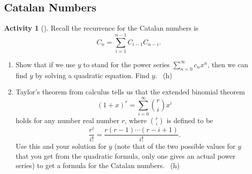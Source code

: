 \documentclass[10pt,]{book}
\theoremstyle{plain}
\theoremstyle{definition}
\theoremstyle{definition}
\theoremstyle{definition}
\newtheorem{activity}[project]{Activity}
\numberwithin{equation}{chapter}
\begin{document}
\subsection[{Catalan Numbers}]{Catalan Numbers}\label{subsection-39}
\begin{activity}[]\label{CatalanRecurrence}
\hypertarget{p-1384}{}%
Recall the recurrence for the Catalan numbers is%
\begin{equation*}
C_n = \sum_{i=1}^{n-1} C_{i-1}C_{n-i}\text{.}
\end{equation*}
%
\begin{enumerate}[font=\bfseries,label=(\alph*),ref=\alph*]
\item\label{task-252} \hypertarget{p-1385}{}%
Show that if we use \(y\) to stand for the power series \(\sum_{n=0}^\infty c_nx^n\), then we can find \(y\) by solving a quadratic equation. Find \(y\).%
~{\tiny (h)}\item\label{task-253} \hypertarget{p-1388}{}%
Taylor's theorem from calculus tells us that the extended binomial theorem%
\begin{equation*}
(1+x)^r = \sum_{i=0}^\infty \binom{r}{i}x^i
\end{equation*}
holds for any number real number \(r\), where \(\binom{r}{i}\) is defined to be%
\begin{equation*}
\frac{r^{\underline{i}}}{i!} = \frac{r(r-1)\cdots(r-i+1)}{i!}\text{.}
\end{equation*}
Use this and your solution for \(y\) (note that of the two possible values for \(y\) that you get from the quadratic formula, only one gives an actual power series) to get a formula for the Catalan numbers.%
~{\tiny (h)}\end{enumerate}
\end{activity}
\typeout{************************************************}
\typeout{************************************************}
\end{document}
